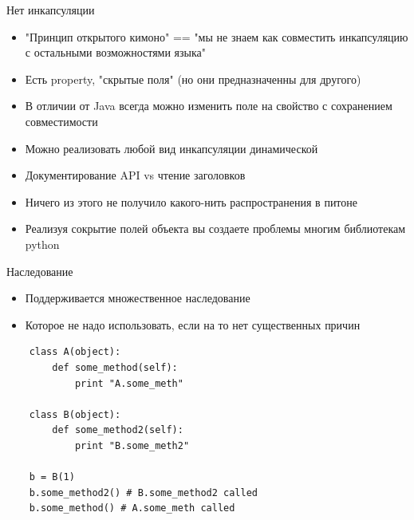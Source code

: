 \documentclass{article}
\begin{document}
\begin{center} Нет инкапсуляции \end{center}
\begin{itemize}
    \item "Принцип открытого кимоно" == 
        "мы не знаем как совместить инкапсуляцию 
        с остальными возможностями языка"
    \item Есть property, "скрытые поля" (но они предназначенны для другого)
    \item В отличии от Java всегда можно изменить поле на свойство 
            с сохранением совместимости
    \item Можно реализовать любой вид инкапсуляции динамической
    \item Документирование API vs чтение заголовков
    \item Ничего из этого не получило какого-нить распространения в питоне
    \item Реализуя сокрытие полей объекта вы 
        создаете проблемы многим библиотекам python
\end{itemize}
\newpage

\begin{center} Наследование \end{center}
\begin{itemize}
    \item Поддерживается множественное наследование
    \item Которое не надо использовать, если на то нет существенных причин
\end{itemize}

{
\Large
\vspace{15pt}
\begin{lstlisting}
    class A(object):
        def some_method(self):
            print "A.some_meth"

    class B(object):
        def some_method2(self):
            print "B.some_meth2"

    b = B(1) 
    b.some_method2() # B.some_method2 called
    b.some_method() # A.some_meth called
\end{lstlisting}
}

\newpage
\end{document}
